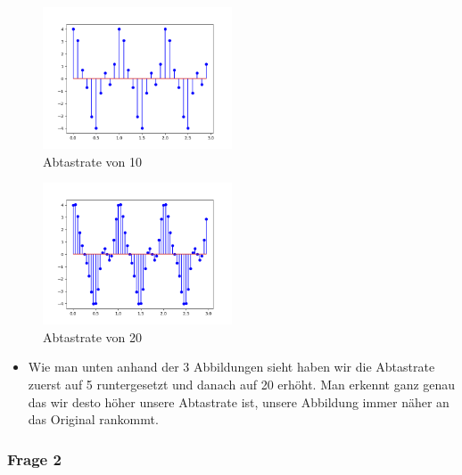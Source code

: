 \documentclass[a4paper, 11pt]{article}
\begin{document}
        \begin{figure}
            \includegraphics[width =0.5\textwidth]{Abild221.png}
            \caption{Abtastrate von 10}
            \label{fig : label3}
            \end{figure}

            \begin{figure}
                \includegraphics[width =0.5\textwidth]{Abild222.png}
                \caption{Abtastrate von 20}
                \label{fig : label4}
                \end{figure}
    
    
                    \begin{itemize}
                    \item Wie man unten anhand der 3 Abbildungen sieht haben wir die Abtastrate zuerst auf 5 runtergesetzt und danach auf 20 erhöht. 
                    Man erkennt ganz genau das wir desto höher unsere Abtastrate ist, unsere Abbildung immer näher an das Original rankommt.
                    \end{itemize}
    
    
   
    
    \subsubsection{Frage 2}
    
\end{document}
